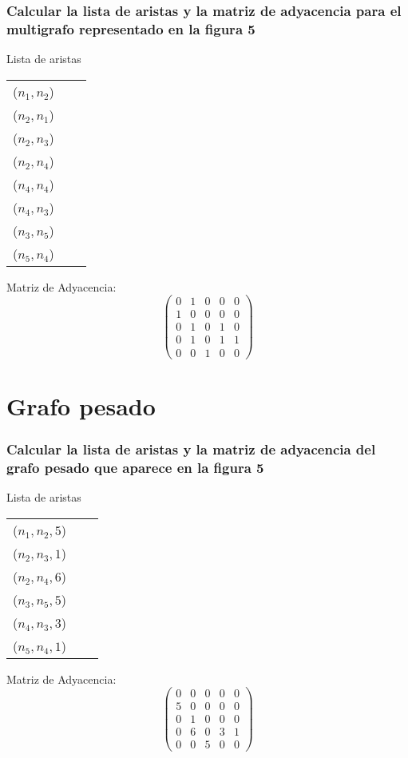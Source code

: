 \subsubsection{\large Calcular la lista de aristas y la matriz de adyacencia para el multigrafo representado en la figura 5}
	Lista de aristas \begin{center}
		\begin{tabular}{ |c|c|c| } 
			\hline
			($n_1,n_2$) \\ 
			($n_2,n_1$) \\ 
			($n_2,n_3$)\\
			($n_2,n_4$)\\
			($n_4,n_4$)\\
			($n_4,n_3$)\\
			($n_3,n_5$)\\
			($n_5,n_4$)\\
			\hline
		\end{tabular}
	\end{center}
Matriz de Adyacencia:
$$\begin{pmatrix}
	0 & 1 & 0 & 0 & 0 \\ 
	1 & 0 & 0 & 0 & 0 \\ 
	0 & 1 & 0 & 1 & 0 \\ 
	0 & 1 & 0 & 1 & 1 \\ 
	0 & 0 & 1 & 0 & 0
\end{pmatrix}$$ 


\section{Grafo pesado}
\subsubsection{\large Calcular la lista de aristas y la matriz de adyacencia del grafo pesado que aparece en la figura 5}

Lista de aristas \begin{center}
	\begin{tabular}{ |c|c|c| } 
		\hline
		($n_1,n_2,5$) \\ 
		($n_2,n_3,1$)\\
		($n_2,n_4,6$)\\
		($n_3,n_5,5$)\\
		($n_4,n_3,3$)\\
		($n_5,n_4,1$)\\
		\hline
	\end{tabular}
\end{center}
Matriz de Adyacencia:
$$\begin{pmatrix}
0 & 0 & 0 & 0 & 0 \\ 
5 & 0 & 0 & 0 & 0 \\ 
0 & 1 & 0 & 0 & 0 \\ 
0 & 6 & 0 & 3 & 1 \\ 
0 & 0 & 5 & 0 & 0
\end{pmatrix}$$ 



